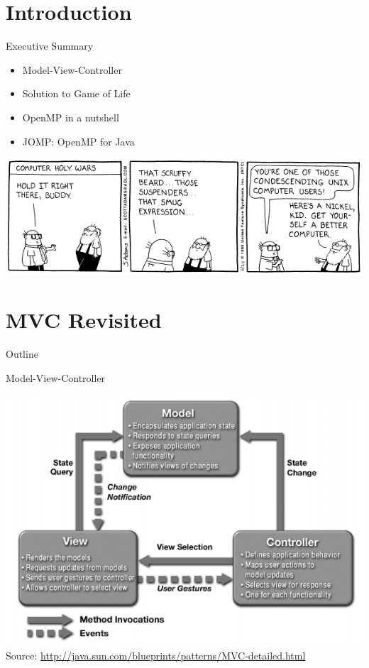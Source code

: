 \section*{Introduction}

\begin{frame}{Executive Summary}
  \begin{itemize}
  \item Model-View-Controller
  \item Solution to Game of Life
  \item OpenMP in a nutshell
  \item JOMP: OpenMP for Java
  \end{itemize}


  \begin{center}
    \includegraphics[scale=0.45]{figures/dilbert}
  \end{center}
\end{frame}


\section{MVC Revisited}

\begin{frame}{Outline}
  \tableofcontents[current]
\end{frame}

\begin{frame}{Model-View-Controller}
  \begin{center}
    \includegraphics[scale=0.4]{figures/mvc} \\
    \tiny{Source: \url{http://java.sun.com/blueprints/patterns/MVC-detailed.html}}
  \end{center}
\end{frame}

